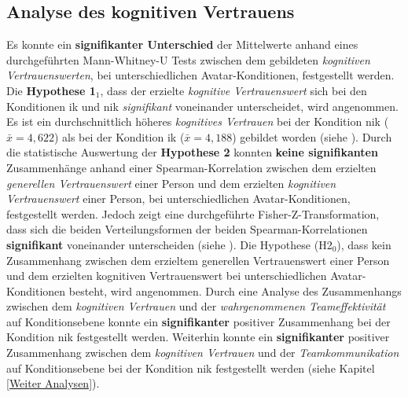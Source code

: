 \documentclass[a4paper,11pt]{article}%
\renewcommand{\\}{\vspace*{0.5\baselineskip} \newline}
\begin{document}
{\subsection{Analyse des kognitiven Vertrauens}
Es konnte ein \textbf{signifikanter Unterschied} der Mittelwerte anhand eines durchgeführten Mann-Whitney-U Tests zwischen dem gebildeten \textit{kognitiven Vertrauenswerten}, bei unterschiedlichen Avatar-Konditionen, festgestellt werden. 
Die \textbf{Hypothese 1$_{1}$}, dass der erzielte \textit{kognitive Vertrauenswert} sich bei den Konditionen \ac{ik} und \ac{nik} \textit{signifikant} voneinander unterscheidet, wird angenommen. Es ist ein durchschnittlich höheres \textit{kognitives Vertrauen} bei der Kondition \ac{nik} ($\bar{x}=4,622$) als bei der Kondition \ac{ik} ($\bar{x}= 4,188$) gebildet worden (siehe ).\\
Durch die statistische Auswertung der \textbf{Hypothese 2} konnten \textbf{keine signifikanten} Zusammenhänge anhand einer Spearman-Korrelation zwischen dem erzielten \textit{generellen Vertrauenswert} einer Person und dem erzielten \textit{kognitiven Vertrauenswert} einer Person, bei unterschiedlichen Avatar-Konditionen, festgestellt werden. Jedoch zeigt eine durchgeführte Fisher-Z-Transformation, dass sich die beiden Verteilungsformen der beiden Spearman-Korrelationen \textbf{signifikant} voneinander unterscheiden (siehe ).\\
Die Hypothese (H2$_{0}$), dass kein Zusammenhang zwischen dem erzieltem generellen Vertrauenswert einer Person und dem erzielten kognitiven Vertrauenswert bei unterschiedlichen Avatar-Konditionen besteht, wird angenommen.\\
Durch eine Analyse des Zusammenhangs zwischen dem \textit{kognitiven Vertrauen} und der \textit{wahrgenommenen Teameffektivität} auf Konditionsebene konnte ein \textbf{signifikanter} positiver Zusammenhang bei der Kondition \ac{nik} festgestellt werden.
Weiterhin konnte ein \textbf{signifikanter} positiver Zusammenhang zwischen dem \textit{kognitiven Vertrauen} und der \textit{Teamkommunikation} auf Konditionsebene bei der Kondition \ac{nik} festgestellt werden (siehe Kapitel \ref{Weiter Analysen}).

}
\end{document}
